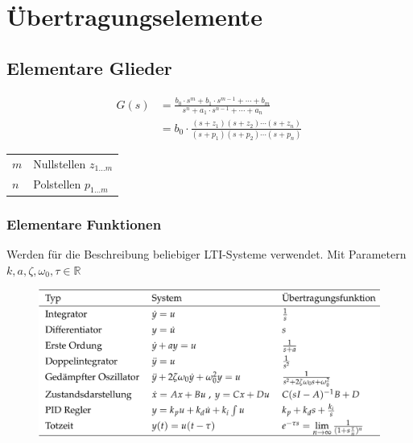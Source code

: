 \documentclass[
  10pt,
  a4paper,
  twocolumn]{article}
\makeatletter
\numberwithin{equation}{section}
\newenvironment{conditions}
  {\par\vspace{\abovedisplayskip}\noindent\begin{tabular}{>{$}l<{$} @{${}:{}$} l}}
  {\end{tabular}\par\vspace{\belowdisplayskip}}
\makeatother
\begin{document}
\hypertarget{uxfcbertragungselemente}{%
\section{Übertragungselemente}\label{uxfcbertragungselemente}}

\hypertarget{elementare-glieder}{%
\subsection{Elementare Glieder}\label{elementare-glieder}}

\[
\begin{split}
G(s) &= \frac{b_0\cdot s^m+b_1\cdot s^{m-1}+\cdots+b_m}{s^n+a_1\cdot s^{n-1}+\cdots+a_n} \\
 &= b_0\cdot\frac{(s+z_1)(s+z_2)\cdots(s+z_n)}{(s+p_1)(s+p_2)\cdots(s+p_n)}
\end{split}
\]

\begin{conditions}
  m & Nullstellen $z_{1\dots m}$ \\
  n & Polstellen $p_{1\dots m}$ \\
\end{conditions}

\hypertarget{elementare-funktionen}{%
\subsubsection{Elementare Funktionen}\label{elementare-funktionen}}

Werden für die Beschreibung beliebiger LTI-Systeme verwendet. Mit
Parametern \(k,a,\zeta,\omega_0,\tau \in \mathbb{R}\)

\begin{figure}[H]

{\centering \includegraphics{images/paste-16.png}

}

\end{figure}
\end{document}
